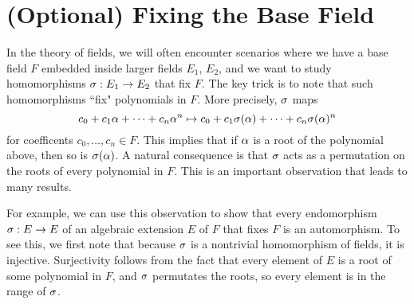 \section{(Optional) Fixing the Base Field}
In the theory of fields, we will often encounter scenarios where we have a base field $F$ embedded inside larger fields $E_1$, $E_2$, and we want to study homomorphisms $\sigma: E_1 \rightarrow E_2$ that fix $F$. The key trick is to note that such homomorphisms ``fix" polynomials in $F$. More precisely, $\sigma$ maps
\[
    c_0 + c_1\alpha + \dots + c_n\alpha^n \mapsto c_0 + c_1\sigma(\alpha) + \dots + c_n\sigma(\alpha)^n
\]
for coefficents $c_0, \dots, c_n \in F$. This implies that if $\alpha$ is a root of the polynomial above, then so is $\sigma(\alpha)$. A natural consequence is that $\sigma$ acts as a permutation on the roots of every polynomial in $F$. This is an important observation that leads to many results.

For example, we can use this observation to show that every endomorphism $\sigma: E \rightarrow E$ of an algebraic extension $E$ of $F$ that fixes $F$ is an automorphism. To see this, we first note that because $\sigma$ is a nontrivial homomorphism of fields, it is injective. Surjectivity follows from the fact that every element of $E$ is a root of some polynomial in $F$, and $\sigma$ permutates the roots, so every element is in the range of $\sigma$.
